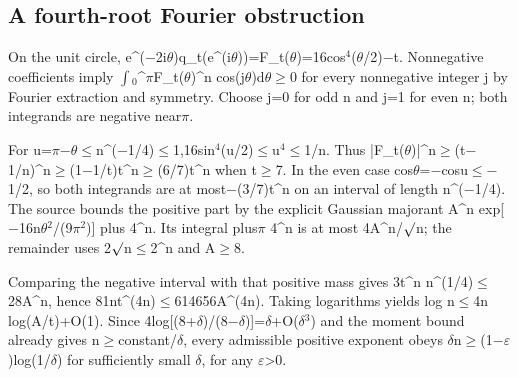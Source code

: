 \documentclass[11pt,a4paper]{article}
\begin{document}
\subsection{A fourth-root Fourier obstruction}
On the unit circle, e\textasciicircum{}(\ensuremath{-}2i\ensuremath{\theta})q\_t(e\textasciicircum{}(i\ensuremath{\theta}))=F\_t(\ensuremath{\theta})=16cos\ensuremath{^4}(\ensuremath{\theta}/2)\ensuremath{-}t. Nonnegative coefficients imply \ensuremath{\int}\ensuremath{_0}\textasciicircum{}\ensuremath{\pi}F\_t(\ensuremath{\theta})\textasciicircum{}n cos(j\ensuremath{\theta})d\ensuremath{\theta}\ensuremath{\geq}0 for every nonnegative integer j by Fourier extraction and symmetry. Choose j=0 for odd n and j=1 for even n; both integrands are negative near\ensuremath{\pi}.

For u=\ensuremath{\pi}\ensuremath{-}\ensuremath{\theta}\ensuremath{\leq}n\textasciicircum{}(\ensuremath{-}1/4)\ensuremath{\leq}1,16sin\ensuremath{^4}(u/2)\ensuremath{\leq}u\ensuremath{^4}\ensuremath{\leq}1/n. Thus |F\_t(\ensuremath{\theta})|\textasciicircum{}n\ensuremath{\geq}(t\ensuremath{-}1/n)\textasciicircum{}n\ensuremath{\geq}(1\ensuremath{-}1/t)t\textasciicircum{}n\ensuremath{\geq}(6/7)t\textasciicircum{}n when t\ensuremath{\geq}7. In the even case cos\ensuremath{\theta}=\ensuremath{-}cosu\ensuremath{\leq}\ensuremath{-}1/2, so both integrands are at most\ensuremath{-}(3/7)t\textasciicircum{}n on an interval of length n\textasciicircum{}(\ensuremath{-}1/4). The source bounds the positive part by the explicit Gaussian majorant A\textasciicircum{}n exp[\ensuremath{-}16n\ensuremath{\theta}\ensuremath{^2}/(9\ensuremath{\pi}\ensuremath{^2})] plus 4\textasciicircum{}n. Its integral plus\ensuremath{\pi} 4\textasciicircum{}n is at most 4A\textasciicircum{}n/\ensuremath{\surd}n; the remainder uses 2\ensuremath{\surd}n\ensuremath{\leq}2\textasciicircum{}n and A\ensuremath{\geq}8.

Comparing the negative interval with that positive mass gives 3t\textasciicircum{}n n\textasciicircum{}(1/4)\ensuremath{\leq}28A\textasciicircum{}n, hence 81nt\textasciicircum{}(4n)\ensuremath{\leq}614656A\textasciicircum{}(4n). Taking logarithms yields log n\ensuremath{\leq}4n log(A/t)+O(1). Since 4log[(8+\ensuremath{\delta})/(8\ensuremath{-}\ensuremath{\delta})]=\ensuremath{\delta}+O(\ensuremath{\delta}\ensuremath{^3}) and the moment bound already gives n\ensuremath{\geq}constant/\ensuremath{\delta}, every admissible positive exponent obeys \ensuremath{\delta}n\ensuremath{\geq}(1\ensuremath{-}\ensuremath{\varepsilon})log(1/\ensuremath{\delta}) for sufficiently small \ensuremath{\delta}, for any \ensuremath{\varepsilon}>0.
\end{document}
